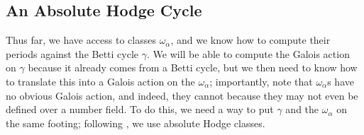 \documentclass[../thesis.tex]{subfiles}
\begin{document}
\subsection{An Absolute Hodge Cycle}
Thus far, we have access to classes $\omega_\alpha$, and we know how to compute their periods against the Betti cycle $\gamma$. We will be able to compute the Galois action on $\gamma$ because it already comes from a Betti cycle, but we then need to know how to translate this into a Galois action on the $\omega_\alpha$; importantly, note that $\omega_\alpha$s have no obvious Galois action, and indeed, they cannot because they may not even be defined over a number field. To do this, we need a way to put $\gamma$ and the $\omega_\alpha$ on the same footing; following \cite[Section~8.5]{ggl-fermat}, we use absolute Hodge classes.
\end{document}
